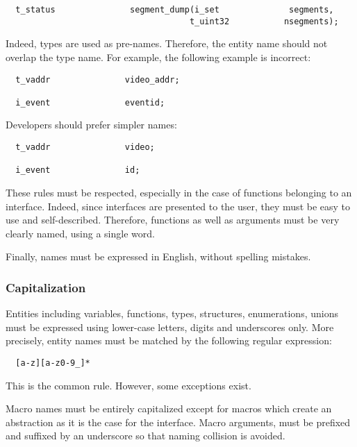 \begin{verbatim}
  t_status               segment_dump(i_set              segments,
                                     t_uint32           nsegments);
\end{verbatim}

Indeed, types are used as pre-names. Therefore, the entity name should
not overlap the type name. For example, the following example is incorrect:

\begin{verbatim}
  t_vaddr               video_addr;

  i_event               eventid;
\end{verbatim}

Developers should prefer simpler names:

\begin{verbatim}
  t_vaddr               video;

  i_event               id;
\end{verbatim}

These rules must be respected, especially in the case of functions belonging
to an interface. Indeed, since interfaces are presented to the user, they
must be easy to use and self-described. Therefore, functions as well as
arguments must be very clearly named, using a single word.

Finally, names must be expressed in English, without spelling mistakes.


\subsubsection{Capitalization}

Entities including variables, functions, types, structures, enumerations,
unions \etc{} must be expressed using lower-case letters, digits and
underscores only. More precisely, entity names must be matched by the following
regular expression:

\begin{verbatim}
  [a-z][a-z0-9_]*
\end{verbatim}

This is the common rule. However, some exceptions exist.

Macro names must be entirely capitalized except for macros which create
an abstraction as it is the case for the  interface. Macro
arguments, must be prefixed and suffixed by an underscore so that naming
collision is avoided.

